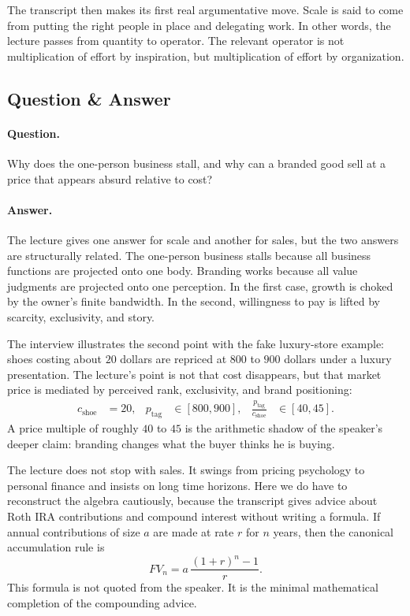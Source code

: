 The transcript then makes its first real argumentative move. Scale is said to come from putting the right people in place and delegating work. In other words, the lecture passes from quantity to operator. The relevant operator is not multiplication of effort by inspiration, but multiplication of effort by organization.

\subsection{Question \& Answer}

\paragraph{Question.}
Why does the one-person business stall, and why can a branded good sell at a price that appears absurd relative to cost?

\paragraph{Answer.}
The lecture gives one answer for scale and another for sales, but the two answers are structurally related. The one-person business stalls because all business functions are projected onto one body. Branding works because all value judgments are projected onto one perception. In the first case, growth is choked by the owner's finite bandwidth. In the second, willingness to pay is lifted by scarcity, exclusivity, and story.

The interview illustrates the second point with the fake luxury-store example: shoes costing about \(20\) dollars are repriced at \(800\) to \(900\) dollars under a luxury presentation. The lecture's point is not that cost disappears, but that market price is mediated by perceived rank, exclusivity, and brand positioning:
\begin{align}
c_{\text{shoe}} &= 20, &
p_{\text{tag}} &\in [800,900], &
\frac{p_{\text{tag}}}{c_{\text{shoe}}} &\in [40,45].
\end{align}
A price multiple of roughly \(40\) to \(45\) is the arithmetic shadow of the speaker's deeper claim: branding changes what the buyer thinks he is buying.

The lecture does not stop with sales. It swings from pricing psychology to personal finance and insists on long time horizons. Here we do have to reconstruct the algebra cautiously, because the transcript gives advice about Roth IRA contributions and compound interest without writing a formula. If annual contributions of size \(a\) are made at rate \(r\) for \(n\) years, then the canonical accumulation rule is
\begin{equation}
FV_n = a\,\frac{(1+r)^n-1}{r}.
\end{equation}
This formula is not quoted from the speaker. It is the minimal mathematical completion of the compounding advice.

